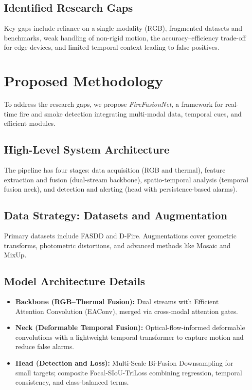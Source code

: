 \documentclass[12pt,a4paper]{article}
\begin{document}
\subsection{Identified Research Gaps}
Key gaps include reliance on a single modality (RGB), fragmented datasets and benchmarks, weak handling of non-rigid motion, the accuracy--efficiency trade-off for edge devices, and limited temporal context leading to false positives.

\section{Proposed Methodology}
To address the research gaps, we propose \emph{FireFusionNet}, a framework for real-time fire and smoke detection integrating multi-modal data, temporal cues, and efficient modules.

\subsection{High-Level System Architecture}
The pipeline has four stages: data acquisition (RGB and thermal), feature extraction and fusion (dual-stream backbone), spatio-temporal analysis (temporal fusion neck), and detection and alerting (head with persistence-based alarms).

\subsection{Data Strategy: Datasets and Augmentation}
Primary datasets include FASDD and D-Fire. Augmentations cover geometric transforms, photometric distortions, and advanced methods like Mosaic and MixUp.

\subsection{Model Architecture Details}
\begin{itemize}
  \item \textbf{Backbone (RGB--Thermal Fusion):} Dual streams with Efficient Attention Convolution (EAConv), merged via cross-modal attention gates.
  \item \textbf{Neck (Deformable Temporal Fusion):} Optical-flow-informed deformable convolutions with a lightweight temporal transformer to capture motion and reduce false alarms.
  \item \textbf{Head (Detection and Loss):} Multi-Scale Bi-Fusion Downsampling for small targets; composite Focal-SIoU-TriLoss combining regression, temporal consistency, and class-balanced terms.
\end{itemize}
\end{document}

